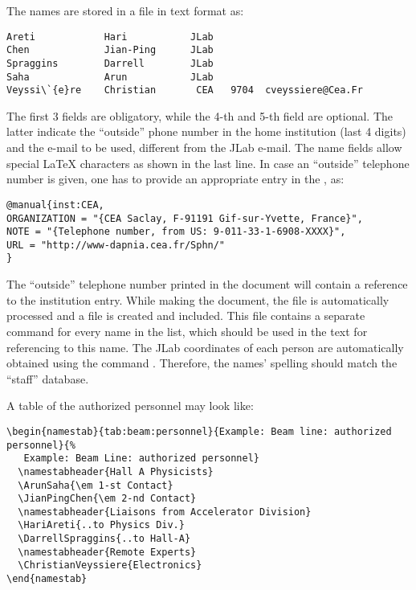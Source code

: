 \documentclass[12pt,letterpaper]{article}
\begin{document}
The names are stored in a file  in text
format as:
{\color{blue}
  \begin{verbatim}
Areti            Hari           JLab
Chen             Jian-Ping      JLab 
Spraggins        Darrell        JLab
Saha             Arun           JLab
Veyssi\`{e}re    Christian       CEA   9704  cveyssiere@Cea.Fr   
  \end{verbatim}%
}\noindent
The first 3 fields are obligatory, while the 4-th and 5-th field
are optional. The latter indicate the ``outside'' phone number in the home institution 
(last 4 digits) and the e-mail to be used, different from the JLab e-mail. The name fields
allow special \LaTeX{} characters as shown in the last line. In case
an ``outside'' telephone number is given, one has to provide an appropriate entry
in the , as:
{\color{blue}
  \begin{verbatim}
@manual{inst:CEA,
ORGANIZATION = "{CEA Saclay, F-91191 Gif-sur-Yvette, France}",
NOTE = "{Telephone number, from US: 9-011-33-1-6908-XXXX}",
URL = "http://www-dapnia.cea.fr/Sphn/"
}
  \end{verbatim}%
}\noindent
The ``outside'' telephone number printed in the document will contain a reference to the
institution entry.
While making the document,
the file  is automatically processed and a file
 is created and included. This file contains
a separate command for every name in the list, which should be used
in the text for referencing to this name. The JLab coordinates of each person
are automatically obtained using the command . Therefore,
the names' spelling should match the ``staff'' database. 

A table of the authorized personnel may look like:
{\color{blue}
  \begin{verbatim}
\begin{namestab}{tab:beam:personnel}{Example: Beam line: authorized personnel}{%
   Example: Beam Line: authorized personnel}
  \namestabheader{Hall A Physicists}
  \ArunSaha{\em 1-st Contact}
  \JianPingChen{\em 2-nd Contact}
  \namestabheader{Liaisons from Accelerator Division}
  \HariAreti{..to Physics Div.}
  \DarrellSpraggins{..to Hall-A}
  \namestabheader{Remote Experts}
  \ChristianVeyssiere{Electronics}
\end{namestab}
  \end{verbatim}%
}\noindent
\end{document}
